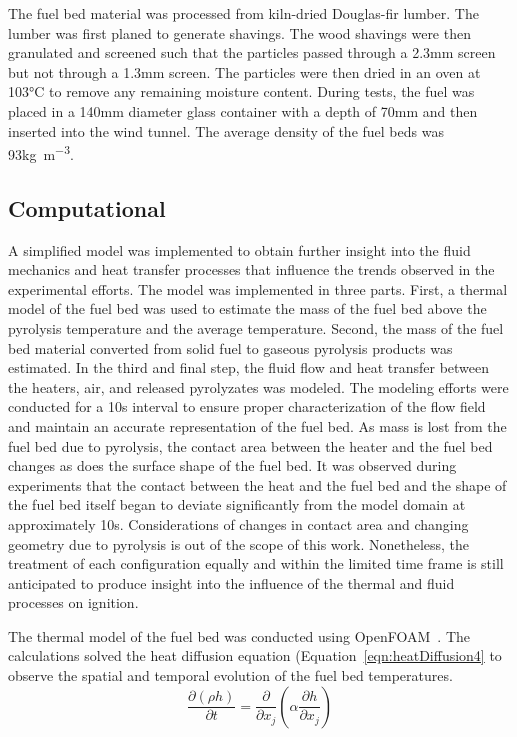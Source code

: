     The fuel bed material was processed from kiln-dried Douglas-fir lumber. The lumber was first planed to generate shavings. The wood shavings were then granulated and screened such that the particles passed through a 2.3\si{\milli\meter} screen but not through a 1.3\si{\milli\meter} screen. The particles were then dried in an oven at 103\si{\celsius} to remove any remaining moisture content. During tests, the fuel was placed in a 140\si{\milli\meter} diameter glass container with a depth of 70\si{\milli\meter} and then inserted into the wind tunnel. The average density of the fuel beds was 93\si{\kilo\gram\per\cubic\meter}.
    
    \subsection{Computational}
    
    A simplified model was implemented to obtain further insight into the fluid mechanics and heat transfer processes that influence the trends observed in the experimental efforts. The model was implemented in three parts. First, a thermal model of the fuel bed was used to estimate the mass of the fuel bed above the pyrolysis temperature and the average temperature. Second, the mass of the fuel bed material converted from solid fuel to gaseous pyrolysis products was estimated. In the third and final step, the fluid flow and heat transfer between the heaters, air, and released pyrolyzates was modeled. The modeling efforts were conducted for a 10\si{\second} interval to ensure proper characterization of the flow field and maintain an accurate representation of the fuel bed. As mass is lost from the fuel bed due to pyrolysis, the contact area between the heater and the fuel bed changes as does the surface shape of the fuel bed. It was observed during experiments that the contact between the heat and the fuel bed and the shape of the fuel bed itself began to deviate significantly from the model domain at approximately 10\si{\second}. Considerations of changes in contact area and changing geometry due to pyrolysis is out of the scope of this work. Nonetheless, the treatment of each configuration equally and within the limited time frame is still anticipated to produce insight into the influence of the thermal and fluid processes on ignition. 
    
    The thermal model of the fuel bed was conducted using OpenFOAM~\cite{Foundation2020}. The calculations solved the heat diffusion equation (Equation~\ref{eqn:heatDiffusion4} to observe the spatial and temporal evolution of the fuel bed temperatures.
        \begin{equation}
            \frac{\partial \left(\rho h \right)}{\partial t} = \frac{\partial}{\partial x_{j}} \left( \alpha \frac{\partial h}{\partial x_{j}} \right)
            \label{eqn:heatDiffusion4}
        \end{equation}
    

